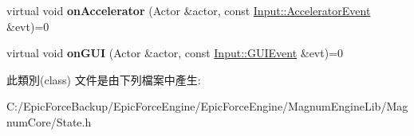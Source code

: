 \begin{DoxyCompactItemize}
\item 
virtual void {\bfseries on\+Accelerator} (Actor \&actor, const \hyperlink{class_magnum_1_1_input_1_1_accelerator_event}{Input\+::\+Accelerator\+Event} \&evt)=0\hypertarget{class_magnum_1_1_state_a35ed60df9051ae8247871fbf809fa787}{}\label{class_magnum_1_1_state_a35ed60df9051ae8247871fbf809fa787}

\item 
virtual void {\bfseries on\+G\+UI} (Actor \&actor, const \hyperlink{class_magnum_1_1_input_1_1_g_u_i_event}{Input\+::\+G\+U\+I\+Event} \&evt)=0\hypertarget{class_magnum_1_1_state_a86b21529949efb7b75a6ef4f8ca3e6a7}{}\label{class_magnum_1_1_state_a86b21529949efb7b75a6ef4f8ca3e6a7}

\end{DoxyCompactItemize}


此類別(class) 文件是由下列檔案中產生\+:\begin{DoxyCompactItemize}
\item 
C\+:/\+Epic\+Force\+Backup/\+Epic\+Force\+Engine/\+Epic\+Force\+Engine/\+Magnum\+Engine\+Lib/\+Magnum\+Core/State.\+h\end{DoxyCompactItemize}
